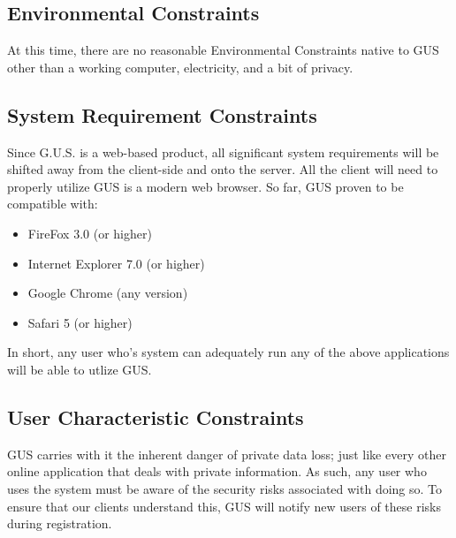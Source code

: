 		\subsection{Environmental Constraints}
At this time, there are no reasonable Environmental Constraints native to GUS other than a working computer, electricity, and a bit of privacy.
		\subsection{System Requirement Constraints}
Since G.U.S. is a web-based product, all significant system requirements will be shifted away from the client-side and onto the server. All the client will need to properly utilize GUS is a modern web browser. So far, GUS proven to be compatible with:
\begin{itemize}
	\item FireFox 3.0 (or higher)
	\item Internet Explorer 7.0 (or higher)
	\item Google Chrome (any version)
	\item Safari 5 (or higher)
\end{itemize} 
In short, any user who's system can adequately run any of the above applications will be able to utlize GUS.
		\subsection{User Characteristic Constraints}
GUS carries with it the inherent danger of private data loss; just like every other online application that deals with private information. As such, any user who uses the system must be aware of the security risks associated with doing so. To ensure that our clients understand this, GUS will notify new users of these risks during registration.
			
